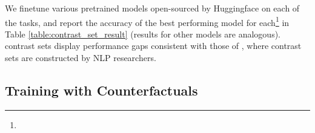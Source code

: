 We finetune various pretrained models open-sourced by Huggingface \cite{Wolf2019HuggingFacesTS} on each of the tasks, and report the accuracy of the best performing model for each\footnote{} in Table \ref{table:contrast_set_result} (results for other models are analogous). \sysname contrast sets display performance gaps consistent with those of \citet{gardner2020contrast}, where contrast sets are constructed by NLP researchers.




\subsection{Training with Counterfactuals}

